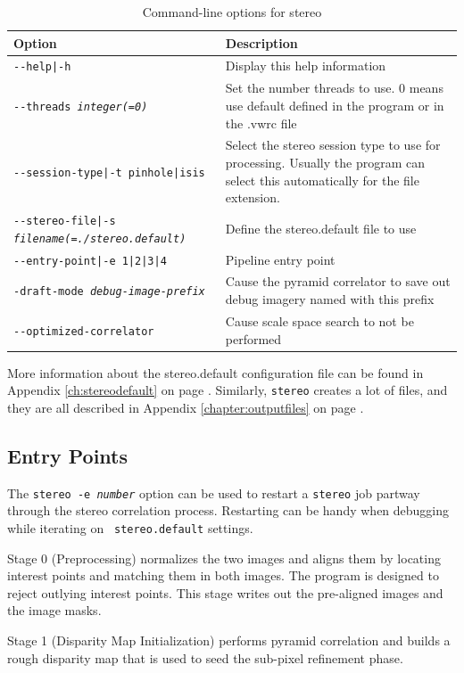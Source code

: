 \begin{longtable}{|l|p{7.5cm}|}
\caption{Command-line options for stereo}
\label{tbl:stereo}
\endfirsthead
\endhead
\endfoot
\endlastfoot
\hline
Option & Description \\ \hline \hline
\texttt{-\/-help|-h} & Display this help information\\ \hline
\texttt{-\/-threads \textit{integer(=0)}} & Set the number threads to use. 0 means use default defined in the program or in the .vwrc file\\ \hline
\texttt{-\/-session-type|-t pinhole|isis} & Select the stereo session type to use for processing. Usually the program can select this automatically for the file extension.\\ \hline
\texttt{-\/-stereo-file|-s \textit{filename(=./stereo.default)}} & Define the stereo.default file to use\\ \hline
\texttt{-\/-entry-point|-e 1|2|3|4} & Pipeline entry point \\ \hline
\texttt{-draft-mode \textit{debug-image-prefix}} & Cause the pyramid correlator to save out debug imagery named with this prefix\\ \hline
\texttt{-\/-optimized-correlator} & Cause scale space search to not be performed\\ \hline
\end{longtable}

More information about the stereo.default configuration file can be found in Appendix \ref{ch:stereodefault} on page \pageref{ch:stereodefault}.  Similarly, \texttt{stereo} creates a lot of files, and they are all described in Appendix \ref{chapter:outputfiles} on page \pageref{chapter:outputfiles}.

\subsection{Entry Points}
\label{entrypoints}

The \texttt{stereo -e \textit{number}} option can be used to restart
a {\tt stereo} job partway through the stereo correlation process.
Restarting can be handy when debugging while iterating on {\tt
stereo.default} settings.

Stage 0 (Preprocessing) normalizes the two images and aligns them
by locating interest points and matching them in both images. The
program is designed to reject outlying interest points.  This stage
writes out the pre-aligned images and the image masks.

Stage 1 (Disparity Map Initialization) performs pyramid correlation and builds a rough disparity map that is used to seed the sub-pixel refinement phase.

